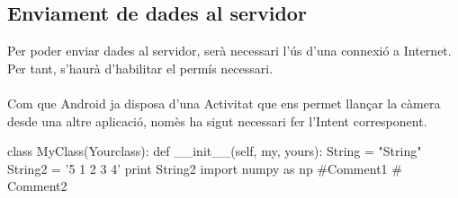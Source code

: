 	\subsection{Enviament de dades al servidor}
		Per poder enviar dades al servidor, serà necessari l'ús d'una connexió a Internet. Per tant, s'haurà d'habilitar el permís necessari.\\\\
		Com que Android ja disposa d'una Activitat que ens permet llançar la càmera desde una altre aplicació, nomès ha sigut necessari fer l'Intent corresponent.\\
		\begin{python}
class MyClass(Yourclass):
  def __init__(self, my, yours):
    String = "String"
    String2 = '5 1 2 3 4'
    print String2
import numpy as np #Comment1
  # Comment2
		\end{python}
